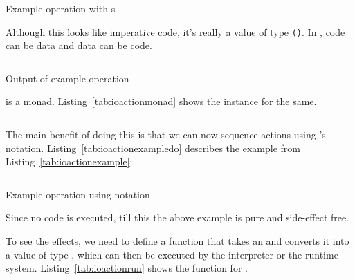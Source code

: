 \documentclass[thesis-solanki.tex]{subfiles}
\begin{document}
\begin{code-list}[H]
\begin{singlespace}
\inputminted{haskell}{haskell-proto4-ioaction-example.hs}
\end{singlespace}
\caption{Example operation with s}
\label{tab:ioactionexample}
\end{code-list}

Although this looks like imperative code, it's really a value of type  \Verb!()!.
In , code can be data and data can be code.

\begin{code-list}[H]
\begin{singlespace}
\inputminted{haskell}{haskell-proto4-ioaction-example-output.hs}
\end{singlespace}
\caption{Output of example operation}
\label{tab:ioactionexampleoutput}
\end{code-list}

 is a monad. Listing~\ref{tab:ioactionmonad} shows the instance for the same.

\begin{code-list}[H]
\begin{singlespace}
\inputminted{haskell}{haskell-proto4-ioaction-monad.hs}
\end{singlespace}
\caption{}
\label{tab:ioactionmonad}
\end{code-list}



The main benefit of doing this is that we can now sequence actions using 's 
notation.
Listing~\ref{tab:ioactionexampledo} describes the example from Listing~\ref{tab:ioactionexample}:

\begin{code-list}[H]
\begin{singlespace}
\inputminted{haskell}{haskell-proto4-ioaction-example-do.hs}
\end{singlespace}
\caption{Example operation using  notation}
\label{tab:ioactionexampledo}
\end{code-list}

Since no code is executed, till this the above example is pure and side-effect free.

To see the effects, we need to define a function that takes an   and
converts it into a value of type  , which can then be executed by the
interpreter or the runtime system.
Listing~\ref{tab:ioactionrun} shows the  function for .
\end{document}
